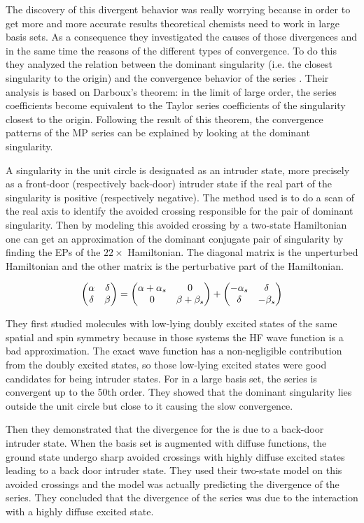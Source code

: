 \documentclass[11pt,a4paper]{article}
\begin{document}
{The discovery of this divergent behavior was really worrying because in order to get more and more accurate results theoretical chemists need to work in large basis sets. As a consequence they investigated the causes of those divergences and in the same time the reasons of the different types of convergence. To do this they analyzed the relation between the dominant singularity (i.e. the closest singularity to the origin) and the convergence behavior of the series \cite{Olsen_2000}. Their analysis is based on Darboux's theorem: in the limit of large order, the series coefficients become equivalent to the Taylor series coefficients of the singularity closest to the origin. Following the result of this theorem, the convergence patterns of the MP series can be explained by looking at the dominant singularity.

A singularity in the unit circle is designated as an intruder state, more precisely as a front-door (respectively back-door) intruder state if the real part of the singularity is positive (respectively negative). The method used is to do a scan of the real axis to identify the avoided crossing responsible for the pair of dominant singularity. Then by modeling this avoided crossing by a two-state Hamiltonian one can get an approximation of the dominant conjugate pair of singularity by finding the EPs of the $22\times$ Hamiltonian. The diagonal matrix is the unperturbed Hamiltonian and the other matrix is the perturbative part of the Hamiltonian.

\begin{equation}
\mqty(\alpha & \delta \\ \delta & \beta) = \mqty(\alpha + \alpha_s & 0 \\ 0 & \beta + \beta_s ) + \mqty(- \alpha_s & \delta \\ \delta & - \beta_s)
\end{equation}
 
They first studied molecules with low-lying doubly excited states of the same spatial and spin symmetry because in those systems the HF wave function is a bad approximation. The exact wave function has a non-negligible contribution from the doubly excited states, so those low-lying excited states were good candidates for being intruder states. For  in a large basis set, the series is convergent up to the 50th order. They showed that the dominant singularity lies outside the unit circle but close to it causing the slow convergence.

Then they demonstrated that the divergence for the  is due to a back-door intruder state. When the basis set is augmented with diffuse functions, the ground state undergo sharp avoided crossings with highly diffuse excited states leading to a back door intruder state. They used their two-state model on this avoided crossings and the model was actually predicting the divergence of the series. They concluded that the divergence of the series was due to the interaction with a highly diffuse excited state. 

}
\end{document}
